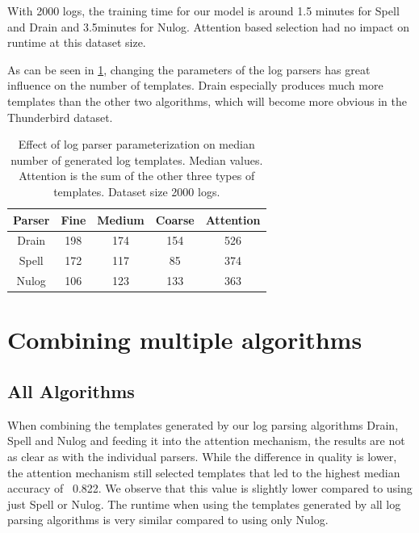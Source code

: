With 2000 logs, the training time for our model is around 1.5 minutes for Spell and Drain and 3.5minutes for Nulog. Attention based selection had no impact on runtime at this dataset size. 

As can be seen in \ref{tab:log_parsers_comparison}, changing the parameters of the log parsers has great influence on the number of templates. Drain especially produces much more templates than the other two algorithms, which will become more obvious in the Thunderbird dataset.  

\begin{table}[htbp]
  \centering
  \begin{tabular}{ccccc}
    \hline
    \textbf{Parser} & \textbf{Fine} & \textbf{Medium} & \textbf{Coarse} & \textbf{Attention} \\
    \hline
    Drain & 198 & 174 & 154 & 526 \\
    Spell & 172 & 117 & 85 & 374 \\
    Nulog & 106 & 123 & 133 & 363 \\
    \hline
  \end{tabular}
  \caption{Effect of log parser parameterization on median number of generated log templates. Median values. Attention is the sum of the other three types of templates. Dataset size 2000 logs.}
  \label{tab:log_parsers_comparison}
\end{table}

\section{Combining multiple algorithms}
\label{sec:Results:Combination}
\subsection{All Algorithms}
When combining the templates generated by our log parsing algorithms Drain, Spell and Nulog and feeding it into the attention mechanism, the results are not as clear as with the individual parsers. While the difference in quality is lower, the attention mechanism still selected templates that led to the highest median accuracy of ~0.822. We observe that this value is slightly lower compared to using just Spell or Nulog. The runtime when using the templates generated by all log parsing algorithms is very similar compared to using only Nulog.


